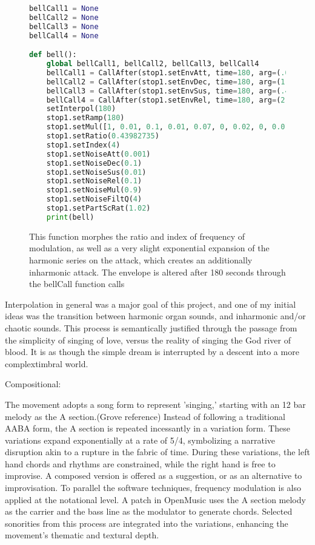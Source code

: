 \documentclass[12pt,twoside,maitrise]{dms}
\theoremstyle{definition}
\begin{document}
\begin{figure}[H]
\begin{lstlisting}[language=Python]
bellCall1 = None
bellCall2 = None
bellCall3 = None
bellCall4 = None

def bell():
    global bellCall1, bellCall2, bellCall3, bellCall4 
    bellCall1 = CallAfter(stop1.setEnvAtt, time=180, arg=(.001, .001, .001, .001, 0.001, 0.001, 0.0001, 0.0006, 0.0007, 0.0005, 0.0006, 0.0003, 0.0005, 0.0003, 0.0006, 0.0005, 0.0004, 0.0002, 0.0001, 0.0001)).play()
    bellCall2 = CallAfter(stop1.setEnvDec, time=180, arg=(1.3, .05, .02, 0, 0, 0.04, .004, 0.04, .04, 0.04, .04, 0.04, .04, 0.04, .04, 0.04, .04, 0.04, .04, 0.04)).play()
    bellCall3 = CallAfter(stop1.setEnvSus, time=180, arg=(.4, .1, .02, .01, .01, 0.01, .01, 0.01, .01, 0.01, .01, 0.01, .01, 0.01, .01, 0.01, .01, 0.01, .002, 0.002)).play()
    bellCall4 = CallAfter(stop1.setEnvRel, time=180, arg=(2, 0.1, 0.1, .01, .03, 0.4, .04, 0.04, .04, 0.04, .04, 0.04, .04, 0.04, .04, 0.4, .04, 0.04, .04, 0.4)).play()
    setInterpol(180)
    stop1.setRamp(180)
    stop1.setMul([1, 0.01, 0.1, 0.01, 0.07, 0, 0.02, 0, 0.01, 0, 0.003, 0, 0.003, 0, 0.001, 0, 0.001, 0, 0.001, 0])
    stop1.setRatio(0.43982735)
    stop1.setIndex(4)
    stop1.setNoiseAtt(0.001)
    stop1.setNoiseDec(0.1)
    stop1.setNoiseSus(0.01)
    stop1.setNoiseRel(0.1)    
    stop1.setNoiseMul(0.9)
    stop1.setNoiseFiltQ(4)
    stop1.setPartScRat(1.02)
    print(bell)
\end{lstlisting}
\caption{This function morphes the ratio and index of frequency of modulation, as well as a very slight exponential expansion of the harmonic series on the attack, which creates an additionally inharmonic attack. The envelope is altered after 180 seconds through the bellCall function calls}
\end{figure}

Interpolation in general was a major goal of this project, and one of my initial ideas was the transition between harmonic organ sounds, and inharmonic and/or chaotic sounds.
This process is semantically justified through the passage from the simplicity of singing of love, versus the reality of singing the God river of blood.
It is as though the simple dream is interrupted by a descent into a more complextimbral world.

Compositional:

The movement adopts a song form to represent 'singing,' starting with an 12 bar melody as the A section.(Grove reference)
Instead of following a traditional AABA form, the A section is repeated incessantly in a variation form.
These variations expand exponentially at a rate of 5/4, symbolizing a narrative disruption akin to a rupture in the fabric of time.
During these variations, the left hand chords and rhythms are constrained, while the right hand is free to improvise. 
A composed version is offered as a suggestion, or as an alternative to improvisation.
To parallel the software techniques, frequency modulation is also applied at the notational level.
A patch in OpenMusic uses the A section melody as the carrier and the bass line as the modulator to generate chords.
Selected sonorities from this process are integrated into the variations, enhancing the movement's thematic and textural depth.
\end{document}
